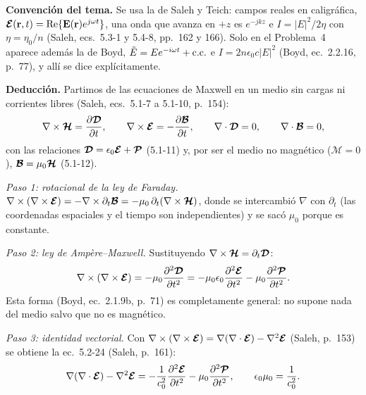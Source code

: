 
\noindent\textbf{Convención del tema.} Se usa la de Saleh y Teich: campos reales en caligráfica,
$\boldsymbol{\mathcal E}(\mathbf r,t)=\mathrm{Re}\{\mathbf E(\mathbf r)e^{j\omega t}\}$, una onda que avanza en $+z$ es $e^{-jkz}$ e
$I=|E|^2/2\eta$ con $\eta=\eta_0/n$ (Saleh, ecs.~5.3-1 y 5.4-8, pp.~162 y 166). Solo en el
Problema~4 aparece además la de Boyd, $\tilde E=Ee^{-i\omega t}+\text{c.c.}$ e $I=2n\epsilon_0c|E|^2$
(Boyd, ec.~2.2.16, p.~77), y allí se dice explícitamente.

\label{sol:1}

 \textbf{Deducción.} Partimos de las ecuaciones de Maxwell en un medio sin cargas ni
corrientes libres (Saleh, ecs.~5.1-7 a 5.1-10, p.~154):
\begin{equation*}
\nabla\times\boldsymbol{\mathcal H}=\frac{\partial\boldsymbol{\mathcal D}}{\partial t},\qquad
\nabla\times\boldsymbol{\mathcal E}=-\frac{\partial\boldsymbol{\mathcal B}}{\partial t},\qquad
\nabla\cdot\boldsymbol{\mathcal D}=0,\qquad \nabla\cdot\boldsymbol{\mathcal B}=0,
\end{equation*}
con las relaciones $\boldsymbol{\mathcal D}=\epsilon_0\boldsymbol{\mathcal E}+\boldsymbol{\mathcal P}$ (5.1-11) y, por ser el medio no magnético
($\boldsymbol{\mathcal M}=0$), $\boldsymbol{\mathcal B}=\mu_0\boldsymbol{\mathcal H}$ (5.1-12).

\emph{Paso 1: rotacional de la ley de Faraday.}
$\nabla\times(\nabla\times\boldsymbol{\mathcal E})=-\nabla\times\partial_t\boldsymbol{\mathcal B}=-\mu_0\,\partial_t(\nabla\times\boldsymbol{\mathcal H})$, donde se
intercambió $\nabla$ con $\partial_t$ (las coordenadas espaciales y el tiempo son independientes) y
se sacó $\mu_0$ porque es constante.

\emph{Paso 2: ley de Ampère--Maxwell.} Sustituyendo $\nabla\times\boldsymbol{\mathcal H}=\partial_t\boldsymbol{\mathcal D}$:
\begin{equation*}
\nabla\times(\nabla\times\boldsymbol{\mathcal E})=-\mu_0\frac{\partial^2\boldsymbol{\mathcal D}}{\partial t^2}
=-\mu_0\epsilon_0\frac{\partial^2\boldsymbol{\mathcal E}}{\partial t^2}-\mu_0\frac{\partial^2\boldsymbol{\mathcal P}}{\partial t^2}.
\end{equation*}
Esta forma (Boyd, ec.~2.1.9b, p.~71) es completamente general: no supone nada del medio salvo que
no es magnético.

\emph{Paso 3: identidad vectorial.} Con $\nabla\times(\nabla\times\boldsymbol{\mathcal E})=\nabla(\nabla\cdot\boldsymbol{\mathcal E})-\nabla^2\boldsymbol{\mathcal E}$
(Saleh, p.~153) se obtiene la ec.~5.2-24 (Saleh, p.~161):
\begin{equation*}
\nabla(\nabla\cdot\boldsymbol{\mathcal E})-\nabla^2\boldsymbol{\mathcal E}=-\frac{1}{c_0^2}\frac{\partial^2\boldsymbol{\mathcal E}}{\partial t^2}-\mu_0\frac{\partial^2\boldsymbol{\mathcal P}}{\partial t^2},
\qquad \epsilon_0\mu_0=\frac1{c_0^2}.
\end{equation*}


